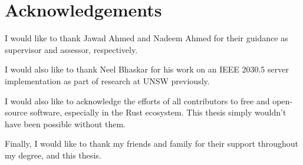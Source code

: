 \chapter*{Acknowledgements}\label{Acknowledgements}
I would like to thank Jawad Ahmed and Nadeem Ahmed for their guidance as supervisor and assessor, respectively.

I would also like to thank Neel Bhaskar for his work on an IEEE 2030.5 server implementation as part of research at UNSW previously.

I would also like to acknowledge the efforts of all contributors to free and open-source software, especially in the Rust ecosystem. This thesis simply wouldn't have been possible without them.

Finally, I would like to thank my friends and family for their support throughout my degree, and this thesis.
